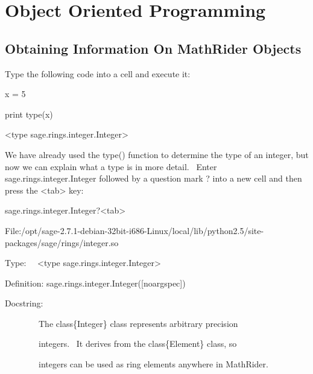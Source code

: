 \documentclass[12pt,twoside]{book}
\begin{document}
\bigskip


\bigskip

\chapter[Object Oriented Programming]{Object Oriented Programming}

\bigskip

\section[Obtaining Information On MathRider Objects]{Obtaining Information On MathRider Objects}

Type the following code into a cell and execute it:


\bigskip

x = 5

print type(x)

{\textbar}

{\textless}type {\textquotesingle}sage.rings.integer.Integer{\textquotesingle}{\textgreater}


\bigskip

We have already used the type() function to determine the type of an integer, but now we can explain what a type is in more detail. \ Enter sage.rings.integer.Integer followed by a question mark {\textquotesingle}?{\textquotesingle} into a new cell and then press the {\textless}tab{\textgreater} key: 

\bigskip

sage.rings.integer.Integer?{\textless}tab{\textgreater}

{\textbar}

File:/opt/sage{}-2.7.1{}-debian{}-32bit{}-i686{}-Linux/local/lib/python2.5/site{}-packages/sage/rings/integer.so


Type: \ \ {\textless}type
{\textquotesingle}sage.rings.integer.Integer{\textquotesingle}{\textgreater}


Definition: sage.rings.integer.Integer([noargspec]) 


\bigskip

Docstring: 


\bigskip

\ \ \ \ \ \ \ \ The class\{Integer\} class represents arbitrary precision 

\ \ \ \ \ \ \ \ integers. \ It derives from the class\{Element\} class, so 

\ \ \ \ \ \ \ \ integers can be used as ring elements anywhere in MathRider. 
\end{document}
